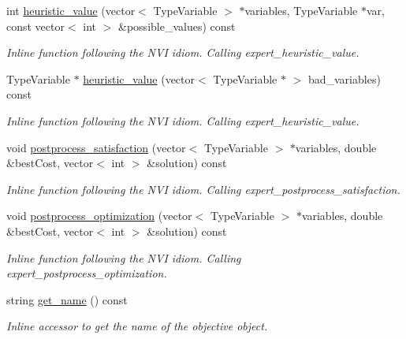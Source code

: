 \begin{DoxyCompactItemize}
int \hyperlink{classghost_1_1Objective_ab9ed9b882b8e865d20eeae168001561a}{heuristic\+\_\+value} (vector$<$ Type\+Variable $>$ $\ast$variables, Type\+Variable $\ast$var, const vector$<$ int $>$ \&possible\+\_\+values) const 
\begin{DoxyCompactList}\small\item\em Inline function following the N\+VI idiom. Calling expert\+\_\+heuristic\+\_\+value. \end{DoxyCompactList}\item 
Type\+Variable $\ast$ \hyperlink{classghost_1_1Objective_ab52e4a66ce78c9477ef44b2d8dde57e6}{heuristic\+\_\+value} (vector$<$ Type\+Variable $\ast$ $>$ bad\+\_\+variables) const 
\begin{DoxyCompactList}\small\item\em Inline function following the N\+VI idiom. Calling expert\+\_\+heuristic\+\_\+value. \end{DoxyCompactList}\item 
void \hyperlink{classghost_1_1Objective_a953abf257ee236e934011754edada4a9}{postprocess\+\_\+satisfaction} (vector$<$ Type\+Variable $>$ $\ast$variables, double \&best\+Cost, vector$<$ int $>$ \&solution) const 
\begin{DoxyCompactList}\small\item\em Inline function following the N\+VI idiom. Calling expert\+\_\+postprocess\+\_\+satisfaction. \end{DoxyCompactList}\item 
void \hyperlink{classghost_1_1Objective_ae9e095cabcd99b2b0a7b1861ecf4ca20}{postprocess\+\_\+optimization} (vector$<$ Type\+Variable $>$ $\ast$variables, double \&best\+Cost, vector$<$ int $>$ \&solution) const 
\begin{DoxyCompactList}\small\item\em Inline function following the N\+VI idiom. Calling expert\+\_\+postprocess\+\_\+optimization. \end{DoxyCompactList}\item 
string \hyperlink{classghost_1_1Objective_aeb2af94526fac09e2c4242817b22ef09}{get\+\_\+name} () const 
\begin{DoxyCompactList}\small\item\em Inline accessor to get the name of the objective object. \end{DoxyCompactList}\end{DoxyCompactItemize}
